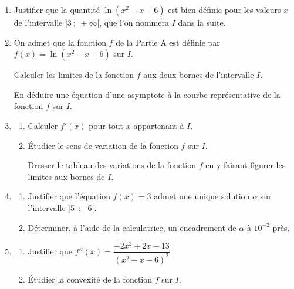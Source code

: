 \begin{enumerate}
\item Justifier que la quantité $\ln \left(x^2- x- 6\right)$ est bien définie pour les valeurs $x$ de l'intervalle $]3~;~ +\infty[$, que l'on nommera $I$ dans la suite.
\item On admet que la fonction $f$ de la Partie A est définie par $f(x) = \ln \left(x^2- x- 6\right)$ sur $I$. 

Calculer les limites de la fonction $f$ aux deux bornes de l'intervalle $I$.

En déduire une équation d'une asymptote à la courbe représentative de la fonction $f$ sur $I$.
\item 
	\begin{enumerate}
		\item Calculer $f'(x)$ pour tout $x$ appartenant à $I$.
		\item Étudier le sens de variation de la fonction $f$ sur $I$.
		
Dresser le tableau des variations de la fonction $f$ en y faisant figurer les limites aux bornes de $I$.
	\end{enumerate}
\item 
	\begin{enumerate}
		\item Justifier que l'équation $f(x) = 3$ admet une unique solution $\alpha$ sur l'intervalle ]5~;~ 6[.
		\item Déterminer, à l'aide de la calculatrice, un encadrement de $\alpha$ à $10^{-2}$ près.
	\end{enumerate}
\item 
	\begin{enumerate}
		\item Justifier que $f''(x) = \dfrac{- 2x^2 + 2x - 13}{\left(x^2 - x - 6\right)^2}$.
		\item Étudier la convexité de la fonction $f$ sur $I$.
	\end{enumerate}
\end{enumerate}

\bigskip
